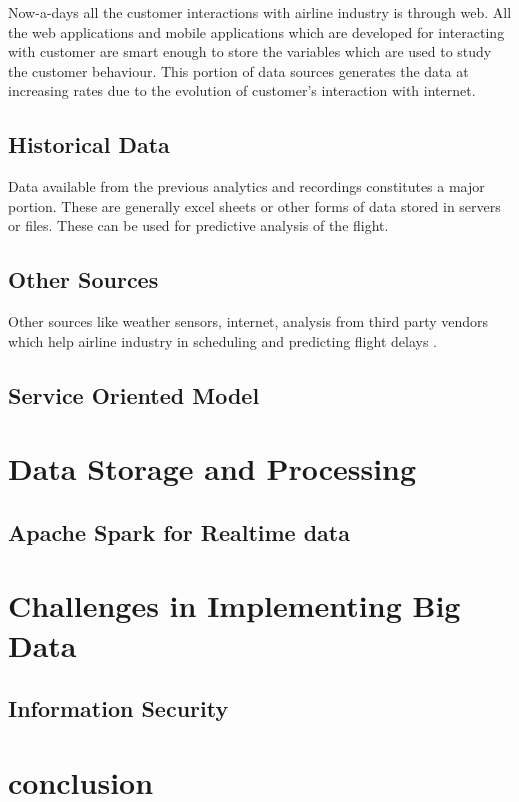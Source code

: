\documentclass[sigconf]{acmart}
\begin{document}
Now-a-days all the customer interactions with airline industry is through web. All the web applications and mobile applications which are developed for interacting with customer are smart enough to store the variables which are used to study the customer behaviour.  This portion of data sources generates the data at increasing rates due to the evolution of customer’s interaction with internet. 

\subsection{Historical Data}

Data available from the previous analytics and recordings constitutes a major portion. These are generally excel sheets or other forms of data stored in servers or files.  These can be used for predictive analysis of the flight.

\subsection{Other Sources}

Other sources like weather sensors, internet, analysis from third party vendors which help airline industry in scheduling and predicting flight delays .

\subsection{Service Oriented Model}

 

\section{Data Storage and Processing}
 

\subsection{Apache Spark for Realtime data}


\section{Challenges in Implementing Big Data}
\subsection{Information Security}

\section{conclusion}




 
\end{document}
